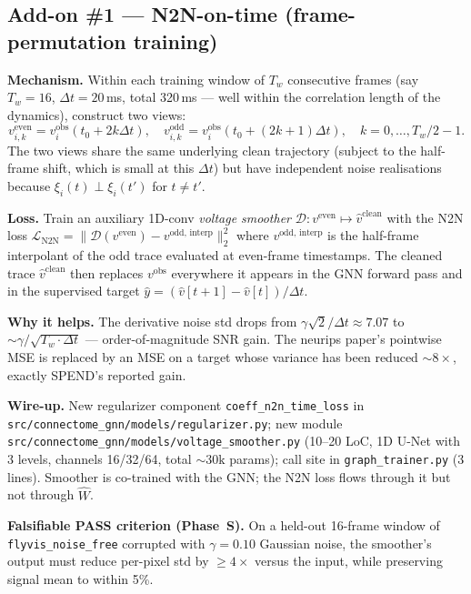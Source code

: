 \documentclass[11pt]{article}
\begin{document}
\subsection{Add-on \#1 --- N2N-on-time (frame-permutation training)}

\textbf{Mechanism.} Within each training window of $T_w$ consecutive frames
(say $T_w = 16$, $\Delta t = 20$\,ms, total 320\,ms --- well within the
correlation length of the dynamics), construct two views:
\[
v^{\text{even}}_{i,k} = v^{\text{obs}}_i(t_0 + 2k \Delta t), \quad
v^{\text{odd}}_{i,k} = v^{\text{obs}}_i(t_0 + (2k{+}1)\Delta t),\quad k=0,\ldots,T_w/2 - 1.
\]
The two views share the same underlying clean trajectory (subject to the
half-frame shift, which is small at this $\Delta t$) but have independent
noise realisations because $\xi_i(t) \perp \xi_i(t')$ for $t \ne t'$.

\textbf{Loss.} Train an auxiliary 1D-conv \emph{voltage smoother}
$\mathcal D: v^{\text{even}} \mapsto \widehat v^{\text{clean}}$ with the
N2N loss
$\mathcal L_{\text{N2N}} = \| \mathcal D(v^{\text{even}}) - v^{\text{odd, interp}}\|_2^2$
where $v^{\text{odd, interp}}$ is the half-frame interpolant of the odd
trace evaluated at even-frame timestamps. The cleaned trace
$\widehat v^{\text{clean}}$ then replaces $v^{\text{obs}}$ everywhere it
appears in the GNN forward pass and in the supervised target
$\widehat y = (\widehat v[t{+}1] - \widehat v[t])/\Delta t$.

\textbf{Why it helps.} The derivative noise std drops from
$\gamma\sqrt 2/\Delta t \approx 7.07$ to
$\sim \gamma/\sqrt{T_w \cdot \Delta t}$ --- order-of-magnitude SNR gain. The
neurips paper's pointwise MSE is replaced by an MSE on a target whose
variance has been reduced $\sim 8\times$, exactly SPEND's reported gain.

\textbf{Wire-up.} New regularizer component
\texttt{coeff\_n2n\_time\_loss} in
\texttt{src/connectome\_gnn/models/regularizer.py}; new module
\texttt{src/connectome\_gnn/models/voltage\_smoother.py} (10--20 LoC, 1D
U-Net with 3 levels, channels 16/32/64, total $\sim 30\text{k}$ params); call site
in \texttt{graph\_trainer.py} (3 lines). Smoother is co-trained with the
GNN; the N2N loss flows through it but not through $\widehat W$.

\textbf{Falsifiable PASS criterion (Phase~S).} On a held-out 16-frame window
of \texttt{flyvis\_noise\_free} corrupted with $\gamma=0.10$ Gaussian noise,
the smoother's output must reduce per-pixel std by $\geq 4\times$ versus
the input, while preserving signal mean to within 5\%.
\end{document}
